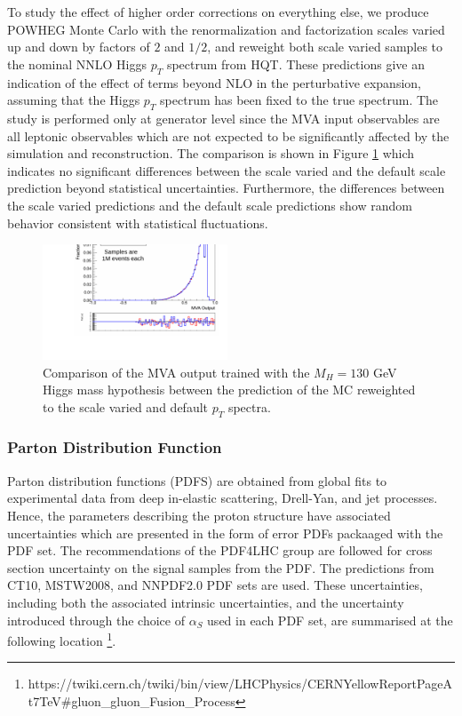 To study the effect of higher order corrections on everything else, we produce
POWHEG Monte Carlo with the renormalization and factorization scales varied 
up and down by factors of $2$ and $1/2$, and reweight both scale varied samples
to the nominal NNLO Higgs $p_{T}$ spectrum from HQT. These predictions give 
an indication of the effect of terms beyond NLO in the perturbative expansion,
assuming that the Higgs $p_{T}$ spectrum has been fixed to the true spectrum. 
The study is performed only at generator level since the MVA input observables
are all leptonic observables which are not expected to be significantly 
affected by the simulation and reconstruction. The comparison is shown in 
Figure \ref{fig:signalshape_PtSpectrumScaleVariation_MVAOutput}
which indicates no significant differences between the scale varied and the default 
scale prediction beyond statistical uncertainties. Furthermore, the differences
between the scale varied predictions and the default scale predictions show
random behavior consistent with statistical fluctuations. 


\begin{figure}[!htbp]
\begin{center}
\includegraphics[width=0.49\textwidth]{figures/ShapeSystematics_HWW_MVA130_PowhegScaleVariationFixedPtSpectrum.pdf}
\caption{Comparison of the MVA output trained with the $M_{H}=130$ GeV Higgs mass hypothesis 
between the prediction of the MC reweighted to the scale varied and default $p_{T}$ spectra. 
}
\label{fig:signalshape_PtSpectrumScaleVariation_MVAOutput}
\end{center}
\end{figure}

\subsubsection{Parton Distribution Function}

Parton distribution functions (PDFS) are obtained from global fits 
to experimental data from deep in-elastic scattering, Drell-Yan, and jet processes.
Hence, the parameters describing the proton structure have associated  
uncertainties which are presented in the form of error PDFs packaaged with the PDF set.
The recommendations of the PDF4LHC group are followed for 
cross section uncertainty on the signal samples from the PDF. 
The predictions from CT10, MSTW2008, and NNPDF2.0 PDF sets are used. 
These uncertainties, including both the associated intrinsic uncertainties,
and the uncertainty introduced through the choice of $\alpha_S$ used in each PDF set,
are summarised at the following location 
\footnote{https://twiki.cern.ch/twiki/bin/view/LHCPhysics/CERNYellowReportPageAt7TeV\#gluon\_gluon\_Fusion\_Process}.

